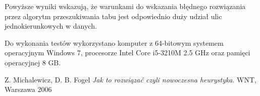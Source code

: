 \documentclass[11pt,a4paper,twoside]{article}
\begin{document}
Powyższe wyniki wskazują, że warunkami do wskazania błędnego rozwiązania przez algorytm przeszukiwania tabu jest odpowiednio duży udział ulic jednokierunkowych w danych.

Do wykonania testów wykorzystano komputer z 64-bitowym systemem operacyjnym Windows 7, procesorze Intel Core i5-3210M 2.5 GHz oraz pamięci operacyjnej 8 GB. 

  
\begin{thebibliography}{9}
Z. Michalewicz, D. B. Fogel
\emph{Jak to rozwiązać czyli nowoczesna heurystyka}.
WNT, Warszawa 2006
\end{thebibliography}
\end{document}
